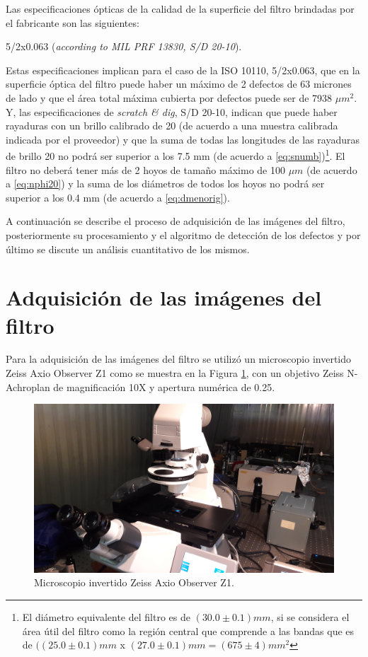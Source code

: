 Las especificaciones ópticas de la calidad de la superficie del filtro brindadas por el fabricante son las siguientes:
\begin{center}
5/2x0.063 (\textit{according to MIL PRF 13830, S/D 20-10}).
\end{center}

Estas especificaciones implican para el caso de la ISO 10110, 5/2x0.063, que en la superficie óptica del filtro puede haber un máximo de 2 defectos de 63 micrones de lado y que el área total máxima cubierta por defectos puede ser de 7938 $\mu m^{2}$. Y, las especificaciones de \textit{scratch \& dig}, S/D 20-10, indican que puede haber rayaduras con un brillo calibrado de 20 (de acuerdo a una muestra calibrada indicada por el proveedor) y que la suma de todas las longitudes de las rayaduras de brillo 20 no podrá ser superior a los 7.5 mm (de acuerdo a \ref{eq:snumb})\footnote{ El diámetro equivalente del filtro es de $(30.0 \pm 0.1 )mm$, si se considera el área útil del filtro como la región central que comprende a las bandas que es de $((25.0 \pm 0.1)mm$ x $(27.0 \pm 0.1) mm = (675 \pm 4) mm^{2}$}. El filtro no deberá tener más de 2 hoyos de tamaño máximo de 100 $\mu m$  (de acuerdo a \ref{eq:nphi20}) y la suma de los diámetros de todos los hoyos no podrá ser superior a los 0.4 mm (de acuerdo a \ref{eq:dmenorig}).


A continuación se describe el proceso de adquisición de las imágenes del filtro, posteriormente su procesamiento y el algoritmo de detección de los defectos y por último se discute un análisis cuantitativo de los mismos.



\singlespacing
\section*{Adquisición de las imágenes del filtro}


\hspace{0.5cm}Para la adquisición de las imágenes del filtro se utilizó un microscopio invertido Zeiss Axio Observer Z1 como se muestra en la Figura \ref{fig:ZEISSdellabo}, con un objetivo Zeiss N-Achroplan de magnificación 10X y apertura numérica de 0.25.
\begin{figure}[H]
	\centering
	\includegraphics[scale=0.08]{Figs/defectosZEISS/b.jpg}
	\caption{Microscopio invertido Zeiss Axio Observer Z1.}
	\label{fig:ZEISSdellabo}
\end{figure}

